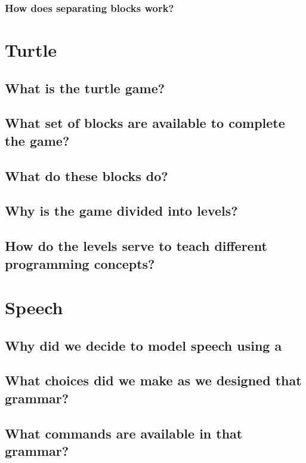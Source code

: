 \documentclass[]{article}
\begin{document}
\subsubsection{How does separating blocks work?}


\section{Turtle}

\subsection{What is the turtle game?}

\subsection{What set of blocks are available to complete the game?}

\subsection{What do these blocks do?}

\subsection{Why is the game divided into levels?}

\subsection{How do the levels serve to teach different programming concepts?}


\section{Speech}

\subsection{Why did we decide to model speech using a} %

\subsection{What choices did we make as we designed that grammar?}

\subsection{What commands are available in that grammar?}
\end{document}
